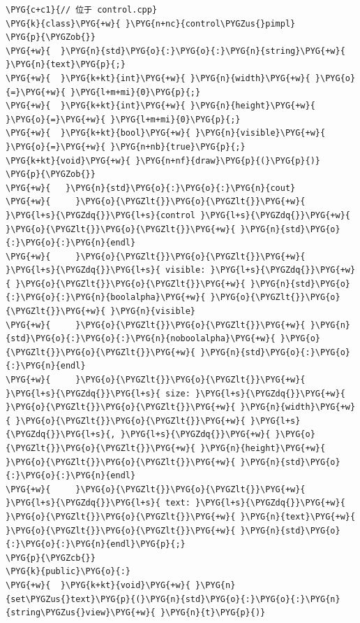 \begin{codeblockbg}
\begin{Verbatim}[commandchars=\\\{\},breaklines=true,breakanywhere=true,fontsize=\codefont,xleftmargin=17bp]
\PYG{c+c1}{// 位于 control.cpp}
\PYG{k}{class}\PYG{+w}{ }\PYG{n+nc}{control\PYGZus{}pimpl}
\PYG{p}{\PYGZob{}}
\PYG{+w}{  }\PYG{n}{std}\PYG{o}{:}\PYG{o}{:}\PYG{n}{string}\PYG{+w}{ }\PYG{n}{text}\PYG{p}{;}
\PYG{+w}{  }\PYG{k+kt}{int}\PYG{+w}{ }\PYG{n}{width}\PYG{+w}{ }\PYG{o}{=}\PYG{+w}{ }\PYG{l+m+mi}{0}\PYG{p}{;}
\PYG{+w}{  }\PYG{k+kt}{int}\PYG{+w}{ }\PYG{n}{height}\PYG{+w}{ }\PYG{o}{=}\PYG{+w}{ }\PYG{l+m+mi}{0}\PYG{p}{;}
\PYG{+w}{  }\PYG{k+kt}{bool}\PYG{+w}{ }\PYG{n}{visible}\PYG{+w}{ }\PYG{o}{=}\PYG{+w}{ }\PYG{n+nb}{true}\PYG{p}{;}
\PYG{k+kt}{void}\PYG{+w}{ }\PYG{n+nf}{draw}\PYG{p}{(}\PYG{p}{)}
\PYG{p}{\PYGZob{}}
\PYG{+w}{   }\PYG{n}{std}\PYG{o}{:}\PYG{o}{:}\PYG{n}{cout}
\PYG{+w}{     }\PYG{o}{\PYGZlt{}}\PYG{o}{\PYGZlt{}}\PYG{+w}{ }\PYG{l+s}{\PYGZdq{}}\PYG{l+s}{control }\PYG{l+s}{\PYGZdq{}}\PYG{+w}{ }\PYG{o}{\PYGZlt{}}\PYG{o}{\PYGZlt{}}\PYG{+w}{ }\PYG{n}{std}\PYG{o}{:}\PYG{o}{:}\PYG{n}{endl}
\PYG{+w}{     }\PYG{o}{\PYGZlt{}}\PYG{o}{\PYGZlt{}}\PYG{+w}{ }\PYG{l+s}{\PYGZdq{}}\PYG{l+s}{ visible: }\PYG{l+s}{\PYGZdq{}}\PYG{+w}{ }\PYG{o}{\PYGZlt{}}\PYG{o}{\PYGZlt{}}\PYG{+w}{ }\PYG{n}{std}\PYG{o}{:}\PYG{o}{:}\PYG{n}{boolalpha}\PYG{+w}{ }\PYG{o}{\PYGZlt{}}\PYG{o}{\PYGZlt{}}\PYG{+w}{ }\PYG{n}{visible}
\PYG{+w}{     }\PYG{o}{\PYGZlt{}}\PYG{o}{\PYGZlt{}}\PYG{+w}{ }\PYG{n}{std}\PYG{o}{:}\PYG{o}{:}\PYG{n}{noboolalpha}\PYG{+w}{ }\PYG{o}{\PYGZlt{}}\PYG{o}{\PYGZlt{}}\PYG{+w}{ }\PYG{n}{std}\PYG{o}{:}\PYG{o}{:}\PYG{n}{endl}
\PYG{+w}{     }\PYG{o}{\PYGZlt{}}\PYG{o}{\PYGZlt{}}\PYG{+w}{ }\PYG{l+s}{\PYGZdq{}}\PYG{l+s}{ size: }\PYG{l+s}{\PYGZdq{}}\PYG{+w}{ }\PYG{o}{\PYGZlt{}}\PYG{o}{\PYGZlt{}}\PYG{+w}{ }\PYG{n}{width}\PYG{+w}{ }\PYG{o}{\PYGZlt{}}\PYG{o}{\PYGZlt{}}\PYG{+w}{ }\PYG{l+s}{\PYGZdq{}}\PYG{l+s}{, }\PYG{l+s}{\PYGZdq{}}\PYG{+w}{ }\PYG{o}{\PYGZlt{}}\PYG{o}{\PYGZlt{}}\PYG{+w}{ }\PYG{n}{height}\PYG{+w}{ }\PYG{o}{\PYGZlt{}}\PYG{o}{\PYGZlt{}}\PYG{+w}{ }\PYG{n}{std}\PYG{o}{:}\PYG{o}{:}\PYG{n}{endl}
\PYG{+w}{     }\PYG{o}{\PYGZlt{}}\PYG{o}{\PYGZlt{}}\PYG{+w}{ }\PYG{l+s}{\PYGZdq{}}\PYG{l+s}{ text: }\PYG{l+s}{\PYGZdq{}}\PYG{+w}{ }\PYG{o}{\PYGZlt{}}\PYG{o}{\PYGZlt{}}\PYG{+w}{ }\PYG{n}{text}\PYG{+w}{ }\PYG{o}{\PYGZlt{}}\PYG{o}{\PYGZlt{}}\PYG{+w}{ }\PYG{n}{std}\PYG{o}{:}\PYG{o}{:}\PYG{n}{endl}\PYG{p}{;}
\PYG{p}{\PYGZcb{}}
\PYG{k}{public}\PYG{o}{:}
\PYG{+w}{  }\PYG{k+kt}{void}\PYG{+w}{ }\PYG{n}{set\PYGZus{}text}\PYG{p}{(}\PYG{n}{std}\PYG{o}{:}\PYG{o}{:}\PYG{n}{string\PYGZus{}view}\PYG{+w}{ }\PYG{n}{t}\PYG{p}{)}

\end{Verbatim}
\end{codeblockbg}
